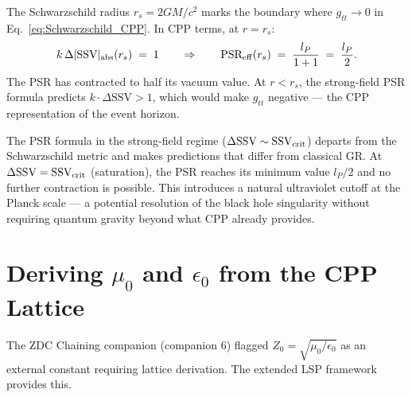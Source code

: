 \documentclass[12pt]{article}
\newcommand{\lP}{l_P}
\newcommand{\SSV}{\text{SSV}}
\newcommand{\PSR}{\text{PSR}}
\begin{document}
The Schwarzschild radius $r_s = 2GM/c^2$ marks the boundary where
$g_{tt} \to 0$ in Eq.~\eqref{eq:Schwarzschild_CPP}.  In CPP terms, at
$r = r_s$:
\begin{equation}
  k\,\Delta|\SSV|_{\rm abs}(r_s) \;=\; 1
  \qquad \Rightarrow \qquad
  \PSR_{\rm eff}(r_s) \;=\; \frac{\lP}{1+1} \;=\; \frac{\lP}{2}.
\end{equation}
The PSR has contracted to half its vacuum value.  At $r < r_s$, the
strong-field PSR formula predicts $k\cdot\Delta\SSV > 1$, which would
make $g_{tt}$ negative --- the CPP representation of the event horizon.

The PSR formula in the strong-field regime ($\Delta\SSV \sim \SSV_{\rm crit}$)
departs from the Schwarzschild metric and makes predictions that differ
from classical GR.  At $\Delta\SSV = \SSV_{\rm crit}$ (saturation), the
PSR reaches its minimum value $\lP/2$ and no further contraction is
possible.  This introduces a natural ultraviolet cutoff at the Planck scale
--- a potential resolution of the black hole singularity without requiring
quantum gravity beyond what CPP already provides.

\section{Deriving $\mu_0$ and $\epsilon_0$ from the CPP Lattice}
\label{sec:mu0eps0}

The ZDC Chaining companion (companion 6) flagged $Z_0 = \sqrt{\mu_0/\epsilon_0}$
as an external constant requiring lattice derivation.  The extended LSP
framework provides this.
\end{document}
